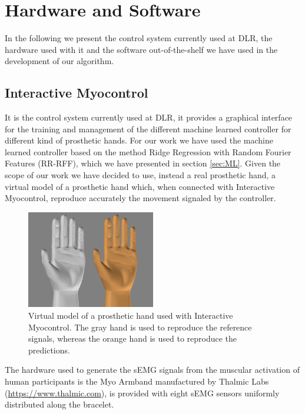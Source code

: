 \section{Hardware and Software}\label{sec:H&S}
In the following we present the control system currently used at DLR, the hardware used with it and the software out-of-the-shelf we have used in the development of our algorithm.
\subsection{Interactive Myocontrol}\label{subsec:interactivemyocontrol}
It is the control system currently used at DLR, it provides a graphical interface for the training and management of the different machine learned controller for different kind of prosthetic hands. For our work we have used the machine learned controller based on the method Ridge Regression with Random Fourier Features (RR-RFF), which we have presented in section \ref{sec:ML}. Given the scope of our work we have decided to use, instead a real prosthetic hand, a virtual model of a prosthetic hand which, when connected with Interactive Myocontrol, reproduce accurately the movement signaled by the controller.
\begin{figure}[ht]
    \centering
    \includegraphics[width=0.5\textwidth]{Images/Blender.PNG}
    \caption{Virtual model of a prosthetic hand used with Interactive Myocontrol. The gray hand is used to reproduce the reference signals, whereas the orange hand is used to reproduce the predictions.}
    \label{fig:hand-blender}
\end{figure}
The hardware used to generate the sEMG signals from the muscular activation of human participants is the Myo Armband manufactured by Thalmic Labs (\href{https://www.thalmic.com}{https://www.thalmic.com}), is provided with eight sEMG sensors uniformly distributed along the bracelet.
